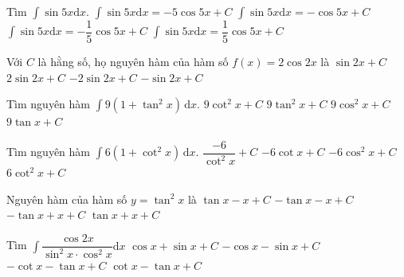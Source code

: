 \begin{ex}
	Tìm $\displaystyle\int \sin 5x\mathrm{d}x$.
	\choice
	{$\displaystyle\int \sin 5x\mathrm{d}x=-5\cos 5x+C$}
	{$\displaystyle\int \sin 5x\mathrm{d}x=-\cos 5x+C$}
	{\True $\displaystyle\int \sin 5x\mathrm{d}x=-\dfrac{1}{5}\cos 5x+C$}
	{$\displaystyle\int \sin 5x\mathrm{d}x=\dfrac{1}{5}\cos 5x+C$}
\end{ex}

\begin{ex}
	Với $C$ là hằng số, họ nguyên hàm của hàm số $f(x)=2\cos 2x$ là
	\haicot
	{\True $\sin 2x+C$}
	{$2\sin 2x+C$}
	{$-2\sin 2x+C$}
	{ $-\sin 2x+C$}
\end{ex}

\begin{ex}
	Tìm nguyên hàm $\displaystyle\int 9\left(1+\tan^2 x\right) \mathrm{\,d}x$. 
	\choice
	{ $9\cot^2 x+C$ }
	{ $9\tan^2 x+C$ }
	{ $9\cos^2 x+C$ }
	{ \True $9\tan x+C$ }
	\end{ex}
\begin{ex}
	Tìm nguyên hàm $\displaystyle\int 6\left(1+\cot^2 x\right)\mathrm{\,d}x$. 
	\choice
	{ $\dfrac{-6}{\cot^2 x}+C$ }
	{ \True $-6\cot x+C$ }
	{ $-6\cos^2 x+C$ }
	{ $6\cot^2 x+C$ }
	\end{ex}

\begin{ex}
	Nguyên hàm của hàm số $y=\tan^2 x$ là
	\haicot
	{\True $\tan x - x+C$}
	{$-\tan x - x+C$}
	{$-\tan x + x+C$}
	{$\tan x + x+C$}
\end{ex}


\begin{ex}
	Tìm $\displaystyle \int \dfrac{\cos{2x}}{\sin^2x\cdot \cos^2x} \mathrm{d}x$
	\haicot
	{$\cos x+\sin x+C $}
	{$-\cos x-\sin x+C $}
	{\True $-\cot x-\tan x+C $}
	{$\cot x-\tan x+C $}
\end{ex}

